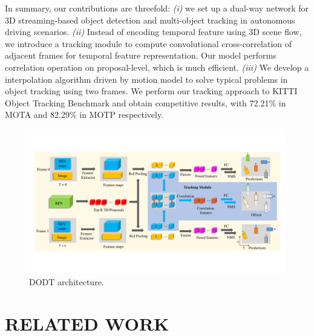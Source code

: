 \documentclass[letterpaper, 10 pt, conference]{ieeeconf}  %
\begin{document}
In summary, our contributions are threefold: \textit{(i)} we set up a dual-way network for 3D streaming-based object detection and multi-object tracking in autonomous driving scenarios. \textit{(ii)} Instead of encoding temporal feature using 3D scene flow, we introduce a tracking module to compute convolutional cross-correlation of adjacent frames for temporal feature representation. Our model performs correlation operation on proposal-level, which is much efficient. \textit{(iii)} We develop a interpolation algorithm driven by motion model to solve typical problems in object tracking using two frames. We perform our tracking approach to KITTI Object Tracking Benchmark and obtain competitive results, with 72.21\% in MOTA and 82.29\% in MOTP respectively.

\begin{figure}
	\vspace{-0.6cm}
	\rule{0pt}{1ex}
	\begin{center}
		\includegraphics[trim={0.5cm, 2.5cm, 0.5cm, 2.5cm}, clip, width=\textwidth]{images/structure.pdf}
	\end{center}
	\caption{DODT architecture.}
	\label{fig:dodt}
	\vspace{-0.4cm}
\end{figure}

\section{RELATED WORK}
\end{document}
